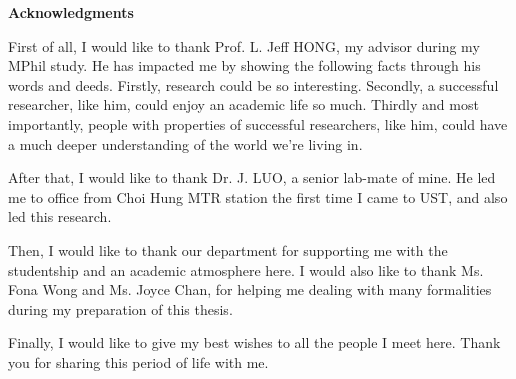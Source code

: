 \centerline{{\bf \Large Acknowledgments}} \vspace{5mm} \noindent

First of all, I would like to thank Prof. L. Jeff HONG, my advisor during my MPhil study. He has impacted me by showing the following facts through his words and deeds. Firstly, research could be so interesting. Secondly, a successful researcher, like him, could enjoy an academic life so much. Thirdly and most importantly, people with properties of successful researchers, like him, could have a much deeper understanding of the world we're living in.

After that, I would like to thank Dr. J. LUO, a senior lab-mate of mine. He led me to office from Choi Hung MTR station the first time I came to UST, and also led this research.

Then, I would like to thank our department for supporting me with the studentship and an academic atmosphere here. I would also like to thank Ms. Fona Wong and Ms. Joyce Chan, for helping me dealing with many formalities during my preparation of this thesis.

Finally, I would like to give my best wishes to all the people I meet here. Thank you for sharing this period of life with me.
